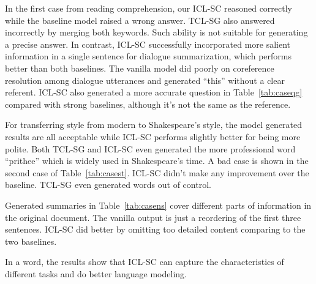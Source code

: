 In the first case from reading comprehension, our ICL-SC reasoned correctly while the baseline model raised a wrong answer. TCL-SG also answered incorrectly by merging both keywords. 
Such ability is not suitable for generating a precise answer.
In contrast, ICL-SC successfully incorporated more salient information in a single sentence for dialogue summarization, which performs better than both baselines. The vanilla model did poorly on coreference resolution among dialogue utterances and generated ``this'' without a clear referent. 
ICL-SC also generated a more accurate question in Table~\ref{tab:caseqg} compared with strong baselines, although it's not the same as the reference.

For transferring style from modern to Shakespeare's style, the model generated results are all acceptable while ICL-SC performs slightly better for being more polite. Both TCL-SG and ICL-SC even generated the more professional word ``prithee'' which is widely used in Shakespeare's time. A bad case is shown in the second case of Table~\ref{tab:casest}. ICL-SC didn't make any improvement over the baseline. TCL-SG even generated words out of control.

Generated summaries in Table~\ref{tab:casens} cover different parts of information in the original document. The vanilla output is just a reordering of the first three sentences.
ICL-SC did better by omitting too detailed content comparing to the two baselines. 

In a word, the results show that ICL-SC can capture the characteristics of different tasks and do better language modeling.













